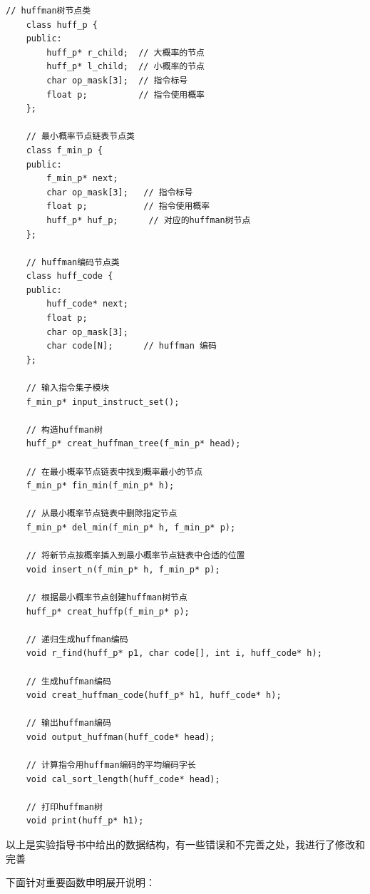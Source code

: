 \documentclass[UTF8,12pt]{article}
\begin{document}
\begin{lstlisting}[frame=shadowbox] 
    // huffman树节点类
    class huff_p {
    public:
        huff_p* r_child;  // 大概率的节点
        huff_p* l_child;  // 小概率的节点
        char op_mask[3];  // 指令标号
        float p;          // 指令使用概率
    };
    
    // 最小概率节点链表节点类
    class f_min_p {
    public:
        f_min_p* next;
        char op_mask[3];   // 指令标号
        float p;           // 指令使用概率
        huff_p* huf_p;      // 对应的huffman树节点
    };
    
    // huffman编码节点类
    class huff_code {
    public:
        huff_code* next;
        float p;
        char op_mask[3];
        char code[N];      // huffman 编码
    };
    
    // 输入指令集子模块
    f_min_p* input_instruct_set();
    
    // 构造huffman树
    huff_p* creat_huffman_tree(f_min_p* head);
    
    // 在最小概率节点链表中找到概率最小的节点
    f_min_p* fin_min(f_min_p* h);
    
    // 从最小概率节点链表中删除指定节点
    f_min_p* del_min(f_min_p* h, f_min_p* p);
    
    // 将新节点按概率插入到最小概率节点链表中合适的位置
    void insert_n(f_min_p* h, f_min_p* p);
    
    // 根据最小概率节点创建huffman树节点
    huff_p* creat_huffp(f_min_p* p);
    
    // 递归生成huffman编码
    void r_find(huff_p* p1, char code[], int i, huff_code* h);
    
    // 生成huffman编码
    void creat_huffman_code(huff_p* h1, huff_code* h);
    
    // 输出huffman编码
    void output_huffman(huff_code* head);
    
    // 计算指令用huffman编码的平均编码字长
    void cal_sort_length(huff_code* head);
    
    // 打印huffman树
    void print(huff_p* h1);
\end{lstlisting}

以上是实验指导书中给出的数据结构，有一些错误和不完善之处，我进行了修改和完善

下面针对重要函数申明展开说明：
\end{document}
